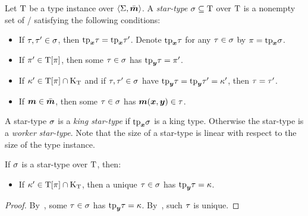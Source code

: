 \begin{definition}
Let $\mathrm{T}$ be a type instance over $\left\langle \mathrm{\Sigma},\bar{\bm{m}} \right\rangle$.
A \emph{star-type} $\sigma \subseteq \mathrm{T}$ over $\mathrm{T}$ is a nonempty
set of \twotypes/ satisfying the following conditions:
\begin{itemize}
  \item[\condstpx]\label{cond:stpx}
  If $\tau, {\tau'} \in \sigma$, then $\mathrm{tp}_{\bm{x}}\tau = \mathrm{tp}_{\bm{x}}{\tau'}$.
  Denote $\mathrm{tp}_{\bm{x}}\tau$ for any $\tau \in \sigma$ by $\pi=\mathrm{tp}_{\bm{x}}\sigma$.
  
  \item[\condstppy]\label{cond:stppy}
  If ${\pi'} \in \mathrm{T}[\pi]$, then some $\tau\in\sigma$ has
  $\mathrm{tp}_{\bm{y}}\tau = {\pi'}$.
  
  \item[\condstpky]\label{cond:stpky}
  If ${\kappa'} \in \mathrm{T}[\pi]\cap{\mathrm{K}}_{\mathrm{T}}$
  and if $\tau,{\tau'} \in \sigma$ have $\mathrm{tp}_{\bm{y}}\tau = \mathrm{tp}_{\bm{y}}{\tau'} = {\kappa'}$,
  then $\tau = {\tau'}$.
  
  \item[\condstpm]\label{cond:stpm}
  If $\bm{m} \in \bar{\bm{m}}$, then some $\tau\in\sigma$ has $\bm{m}(\bm{x},\bm{y}) \in \tau$.
\end{itemize}
\end{definition}
A star-type $\sigma$ is a \emph{king star-type} if $\mathrm{tp}_{\bm{x}}\sigma$ is a king type.
Otherwise the star-type is a \emph{worker star-type}.
Note that the size of a star-type is linear with respect to the size of the type
instance.
\begin{remark}
If $\sigma$ is a star-type over $\mathrm{T}$, then:
\begin{itemize}
  \item[\condstpkyu]\label{cond:stpkyu}
  If ${\kappa'} \in \mathrm{T}[\pi]\cap{\mathrm{K}}_{\mathrm{T}}$,
  then a unique $\tau\in\sigma$ has $\mathrm{tp}_{\bm{y}}\tau = \kappa$.
\end{itemize}
\end{remark}
\begin{proof}
By~, some $\tau\in\sigma$ has $\mathrm{tp}_{\bm{y}}\tau = \kappa$.
By~, such $\tau$ is unique.
\end{proof}

